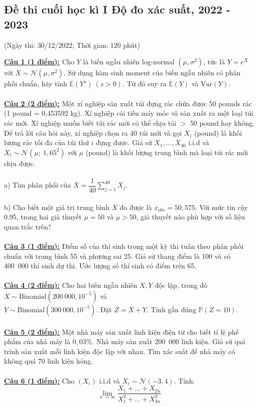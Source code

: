 \documentclass[10pt, a4paper]{article}
\begin{document}
\subsection{Đề thi cuối học kì I Độ đo xác suất, 2022 - 2023}
\begin{center}
	\color{blue}(Ngày thi: 30/12/2022; Thời gian: 120 phút)
\end{center}
\color{red}\underline{\textbf{Câu 1 (1 điểm):}} \color{black}Cho $Y$ là biến ngẫu nhiên log-normal $(\mu,\sigma^2)$, tức là $Y=e^X$ với $X\sim\mathcal N(\mu,\sigma^2)$. Sử dụng hàm sinh moment của biến ngẫu nhiên có phân phối chuẩn, hãy tính $\mathbb{E}(Y^s)~(s>0)$. Từ đó suy ra $\mathbb{E}(Y)$ và $\text{Var}(Y).$\\\\
\color{red}\underline{\textbf{Câu 2 (2 điểm):}} \color{black}Một xí nghiệp sản xuất túi đựng rác chứa được 50 pounds rác (1 pound = 0,453592 kg). Xí nghiệp cải tiến máy móc và sản xuất ra một loại túi rác mới. Xí nghiệp muốn biết túi rác mới có thể chịu tải $>$ 50 pound hay không. Để trả lời câu hỏi này, xí nghiệp chọn ra 40 túi mới và gọi $X_i$ (pound) là khối lượng rác tối đa của túi thứ $i$ đựng được. Giả sử $X_1,\dots,X_{40}$ i.i.d và $X_i\sim\mathcal N(\mu;~1,65^2)$ với $\mu$ (pound) là khối lượng trung bình mà loại túi rác mới chịu được.\\\\
\color{red}a) \color{black}Tìm phân phối của $\overline{X}=\dfrac{1}{40}\displaystyle\sum_{j=1}^{40}X_j$.\\\\
\color{red}b) \color{black}Cho biết một giá trị trung bình $\overline{X}$ đo được là $\overline{x}_{obs}=50,575$. Với mức tin cậy 0.95, trong hai giả thuyết $\mu=50$ và $\mu>50$, giả thuyết nào phù hợp với số liệu quan trắc trên?\\\\
\color{red}\underline{\textbf{Câu 3 (1 điểm):}} \color{black}Điểm số của thí sinh trong một kỳ thi tuân theo phân phối chuẩn với trung bình 55 và phương sai 25. Giả sử thang điểm là 100 và có 400~000 thí sinh dự thi. Ước lượng số thí sinh có điểm trên 65.\\\\
\color{red}\underline{\textbf{Câu 4 (2 điểm):}} \color{black}Cho hai biến ngẫu nhiên $X,Y$ độc lập, trong đó $X\sim\text{Binomial}(200~000,10^{-5})$ và\\ $Y\sim\text{Binomial}(300~000,10^{-5})$. Đặt $Z=X+Y$. Tính gần đúng $\mathbb{P}(Z=10)$.\\\\
\color{red}\underline{\textbf{Câu 5 (2 điểm):}} \color{black}Một nhà máy sản xuất linh kiện điện tử cho biết tỉ lệ phế phẩm của nhà máy là $0,03\%$. Nhà máy sản xuất 200~000 linh kiện. Giả sử quá trình sản xuất mỗi linh kiện độc lập với nhau. Tìm xác suất để nhà máy có không quá 70 linh kiện hỏng.\\\\
\color{red}\underline{\textbf{Câu 6 (1 điểm):}} \color{black}Cho $(X_i)$ i.i.d và $X_i\sim\mathcal N(-3,4)$. Tính: $$\displaystyle\lim_{n\rightarrow\infty}\dfrac{X_1+\ldots+X_{2n}}{X_1^2+\ldots+X_{3n}^2}$$
\end{document}
